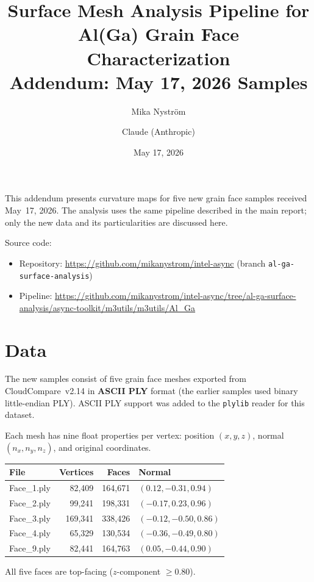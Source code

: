 \documentclass[11pt]{article}
\title{Surface Mesh Analysis Pipeline for\\Al(Ga) Grain Face Characterization\\[6pt]
       {\large Addendum: May 17, 2026 Samples}}
\author{Mika Nystr\"om \and Claude (Anthropic)}
\date{May 17, 2026}
\begin{document}
\maketitle

This addendum presents curvature maps for five new grain face
samples received May~17, 2026.  The analysis uses the same pipeline
described in the main report; only the new data and its
particularities are discussed here.

Source code:
\begin{itemize}
\item Repository: \url{https://github.com/mikanystrom/intel-async} (branch \texttt{al-ga-surface-analysis})
\item Pipeline: \url{https://github.com/mikanystrom/intel-async/tree/al-ga-surface-analysis/async-toolkit/m3utils/m3utils/Al_Ga}
\end{itemize}

\section{Data}

The new samples consist of five grain face meshes exported from
CloudCompare~v2.14 in \textbf{ASCII PLY} format (the earlier
samples used binary little-endian PLY).  ASCII PLY support was
added to the \texttt{plylib} reader for this dataset.

Each mesh has nine float properties per vertex: position
$(x, y, z)$, normal $(n_x, n_y, n_z)$, and original coordinates.

\begin{center}
\begin{tabular}{lrrl}
\toprule
\textbf{File} & \textbf{Vertices} & \textbf{Faces} & \textbf{Normal} \\
\midrule
Face\_1.ply & 82,409 & 164,671 & $(0.12, -0.31, 0.94)$ \\
Face\_2.ply & 99,241 & 198,331 & $(-0.17, 0.23, 0.96)$ \\
Face\_3.ply & 169,341 & 338,426 & $(-0.12, -0.50, 0.86)$ \\
Face\_4.ply & 65,329 & 130,534 & $(-0.36, -0.49, 0.80)$ \\
Face\_9.ply & 82,441 & 164,763 & $(0.05, -0.44, 0.90)$ \\
\bottomrule
\end{tabular}
\end{center}

All five faces are top-facing ($z$-component $\geq 0.80$).
\end{document}

